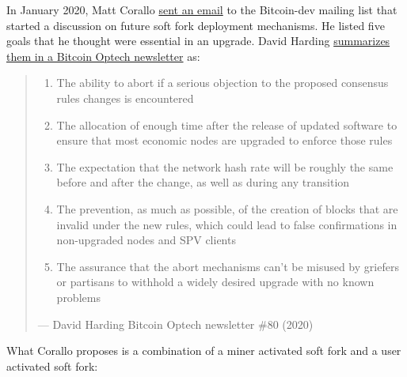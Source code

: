 In January 2020, Matt Corallo
\href{https://lists.linuxfoundation.org/pipermail/bitcoin-dev/2020-January/017547.html}{sent
an email} to the Bitcoin-dev mailing list that started a discussion on
future soft fork deployment mechanisms. He listed five goals that he
thought were essential in an upgrade. David Harding
\href{https://bitcoinops.org/en/newsletters/2020/01/15/\#discussion-of-soft-fork-activation-mechanisms}{summarizes
them in a Bitcoin Optech newsletter} as:

\begin{quote}
\begin{enumerate}
\def\labelenumi{\arabic{enumi}.}
\item
  The ability to abort if a serious objection to the proposed consensus
  rules changes is encountered
\item
  The allocation of enough time after the release of updated software to
  ensure that most economic nodes are upgraded to enforce those rules
\item
  The expectation that the network hash rate will be roughly the same
  before and after the change, as well as during any transition
\item
  The prevention, as much as possible, of the creation of blocks that
  are invalid under the new rules, which could lead to false
  confirmations in non-upgraded nodes and SPV clients
\item
  The assurance that the abort mechanisms can't be misused by griefers
  or partisans to withhold a widely desired upgrade with no known
  problems
\end{enumerate}

---  David Harding Bitcoin Optech newsletter \#80 (2020)
\end{quote}

What Corallo proposes is a combination of a miner activated soft fork
and a user activated soft fork:

